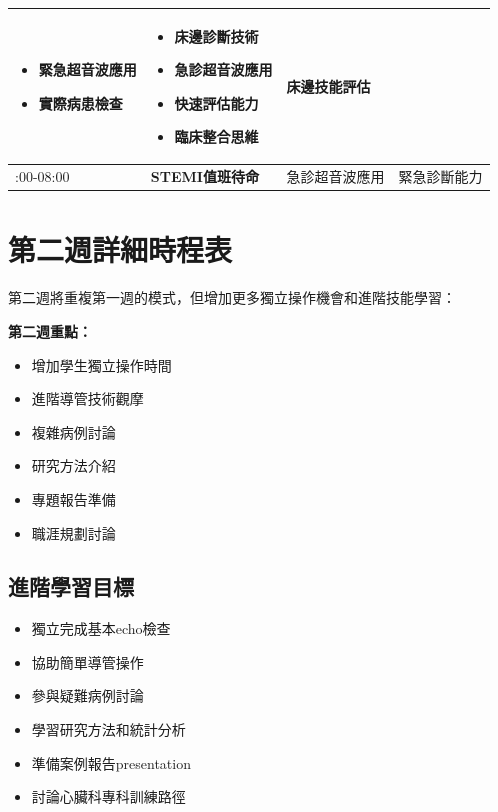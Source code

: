 \documentclass[12pt,a4paper]{article}
\begin{document}
\begin{longtable}{|>{\raggedright\arraybackslash}p{2cm}|>{\raggedright\arraybackslash}p{4cm}|>{\raggedright\arraybackslash}p{4cm}|>{\raggedright\arraybackslash}p{4cm}|}
\begin{itemize}[nosep]
\item 緊急超音波應用
\item 實際病患檢查
\end{itemize} & 
\begin{itemize}[nosep]
\item 床邊診斷技術
\item 急診超音波應用
\item 快速評估能力
\item 臨床整合思維
\end{itemize} & 
床邊技能評估 \\
\hline
22:00-08:00 & 
\textcolor{emergency_red}{\textbf{STEMI值班待命}} & 
急診超音波應用 & 
緊急診斷能力 \\
\hline
\end{longtable}

\section{第二週詳細時程表}

第二週將重複第一週的模式，但增加更多獨立操作機會和進階技能學習：

\begin{importantbox}
\textbf{第二週重點：}
\begin{itemize}[nosep]
\item 增加學生獨立操作時間
\item 進階導管技術觀摩
\item 複雜病例討論
\item 研究方法介紹
\item 專題報告準備
\item 職涯規劃討論
\end{itemize}
\end{importantbox}

\subsection{進階學習目標}
\begin{itemize}[nosep]
    \item 獨立完成基本echo檢查
    \item 協助簡單導管操作
    \item 參與疑難病例討論
    \item 學習研究方法和統計分析
    \item 準備案例報告presentation
    \item 討論心臟科專科訓練路徑
\end{itemize}
\end{document}
